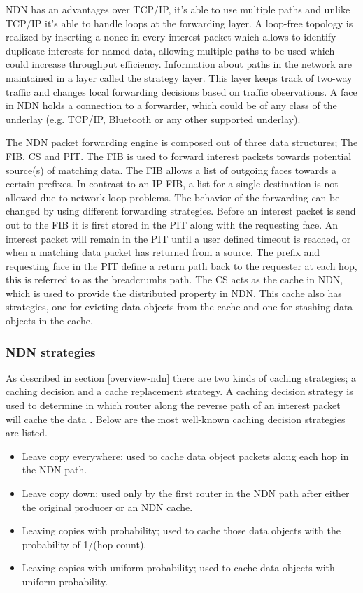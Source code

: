 NDN has an advantages over TCP/IP, it's able to use multiple paths and unlike TCP/IP it's able to handle loops at the forwarding layer. A loop-free topology is realized by inserting a nonce in every interest packet which allows to identify duplicate interests for named data, allowing multiple paths to be used which could increase throughput efficiency. Information about paths in the network are maintained in a layer called the strategy layer. This layer keeps track of two-way traffic and changes local forwarding decisions based on traffic observations. A face in NDN holds a connection to a forwarder, which could be of any class of the underlay (e.g. TCP/IP, Bluetooth or any other supported underlay).

The NDN packet forwarding engine is composed out of three data structures; The FIB, CS and PIT. The FIB is used to forward interest packets towards potential source(s) of matching data. The FIB allows a list of outgoing faces towards a certain prefixes. In contrast to an IP FIB, a list for a single destination is not allowed due to network loop problems. The behavior of the forwarding can be changed by using different forwarding strategies. Before an interest packet is send out to the FIB it is first stored in the PIT along with the requesting face. An interest packet will remain in the PIT until a user defined timeout is reached, or when a matching data packet has returned from a source. The prefix and requesting face in the PIT define a return path back to the requester at each hop, this is referred to as the breadcrumbs path. The CS acts as the cache in NDN, which is used to provide the distributed property in NDN. This cache also has strategies, one for evicting data objects from the cache and one for stashing data objects in the cache.

\subsubsection{NDN strategies}
As described in section \ref{overview-ndn} there are two kinds of caching strategies; a caching decision and a cache replacement strategy. A caching decision strategy is used to determine in which router along the reverse path of an interest packet will cache the data \cite{koulouzis2018information}. Below are the most well-known caching decision strategies are listed.

\begin{itemize}
    \item Leave copy everywhere; used to cache data object packets along each hop in the NDN path.
    \item Leave copy down; used only by the first router in the NDN path after either the original producer or an NDN cache.
    \item Leaving copies with probability; used to cache those data objects with the probability of 1/(hop count).
    \item Leaving copies with uniform probability; used to cache data objects with uniform probability.
\end{itemize}

